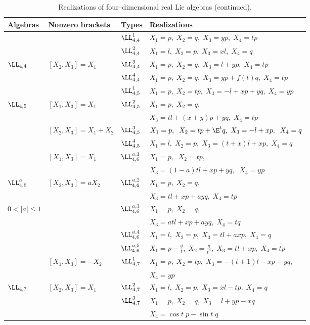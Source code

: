 \begin{table}
\label{t4}
\caption{Realizations of four--dimensional real Lie algebras (continued).}
\begin{center}
\begin{tabular}{|l|l|l|l|}
\hline
Algebras & Nonzero brackets & Types & Realizations\\
\hline
 &  &$\LL_{4,4}^1$ & $X_1=p,\;X_2=q,\;X_3=yp,\;X_4=tp$ \\
 \cline{3-4}
 &  & $\LL_{4,4}^2$ & $ X_1=l,\;X_2=p,\;X_3=xl,\;X_4=q$\\
\cline{3-4}
$\LL_{4,4}$ & $[X_2,X_3]=X_1$ & $\LL_{4,4}^3$ & $X_1=p,\;X_2=q,\;
                                X_3=l+yp,\;X_4=tp $\\
\cline{3-4}
  &   & $\LL_{4,4}^4$ & $ X_1=p,\;X_2=q,\;X_3=yp+f(t)q,\;X_4=tp$\\ 
\hline

  &   & $\LL_{4,5}^1$ & $ X_1=p,\;X_2=tp,\;X_3=-l+xp+yq,\;X_4=yp$\\
\cline{3-4}
$\LL_{4,5}$ & $[X_1,X_3]=X_1$ & $\LL_{4,5}^2$ & $X_1=p,\;X_2=q,$ \\
&  &  &                               $ X_3=tl+(x+y)p+yq,\;X_4=tp$\\
\cline{3-4}
 &  $[X_2,X_3]=X_1+X_2$ & $\LL_{4,5}^3$ & $X_1=p,\;\;X_2=tp+\E^tq
,\;  X_3=-l+xp,\;\;X_4=q$\\
\cline{3-4}
& &$\LL_{4,5}^4$ & $X_1=l,\;X_2=p,\;X_3=(t+x)l+xp,\;X_4=q$\\
\hline
& $[X_1,X_3]=X_1$ & $\LL_{4,6}^{a,1}$ & $X_1=p,\;\;X_2=tp,$\\
  &  &  & $ X_3=(1-a)tl+xp+yq,\;\;X_4=yp$\\
\cline{3-4}
$\LL_{4,6}^a$ & $[X_2,X_3]=aX_2$ & $\LL_{4,6}^{a,2}$ & $X_1=p,\;X_2=q,$\\
& & & $ X_3=tl+xp+ayq,\;X_4=tp$\\
\cline{3-4}
$0<|a|\le 1$ &   & $\LL_{4,6}^{a,3}$ & $X_1=p,\;X_2=q,$\\
& & & $X_3=atl+xp+ayq,\;X_4=tq$\\  
\cline{3-4}
& & $\LL_{4,6}^{a,4}$& $X_1=l,\;X_2=p,\;X_3=tl+axp,\;X_4=q$\\ 
\cline{3-4}
& & $\LL_{4,6}^{a,5}$ & $X_1=p-\displaystyle{\frac{q}{t},
\;X_2=\frac{q}{t^a}},\;X_3=tl+xp,\;
X_4=tp$ \\
\hline 
 & $[X_1,X_3]=-X_2$ & $\LL_{4,7}^1$ & $X_1=p,\;X_2=tp,\;X_3=-(t+1)l-xp-yq,$\\
 &   &   &                                      $ X_4=yp$\\
\cline{3-4}
$\LL_{4,7}$ & $[X_2,X_3]=X_1$ & $\LL_{4,7}^2$ & $X_1=l,\;X_2=p,\;X_3=xl-tp,\;
                                                 X_4=q$\\
\cline{3-4}
 &  & $\LL_{4,7}^3 $ & $ X_1=p,\;X_2=q,\;X_3=l+yp-xq$\\
 &  &   & $X_4=\cos t\;p- \sin t\; q$\\ 
\hline 
\end{tabular}
\end{center}
\end{table}

%
 
